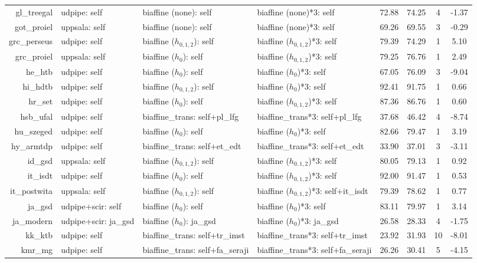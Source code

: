 \documentclass[11pt,a4paper]{article}
\begin{document}
\begin{table}[t]
\begin{tabular}{rlllcccc}
		gl\_treegal & udpipe: self & biaffine (none): self & biaffine (none)*3: self & 72.88 & 74.25 & 4 & -1.37 \\
		got\_proiel & uppsala: self & biaffine (none): self & biaffine (none)*3: self & 69.26 & 69.55 & 3 & -0.29 \\
		grc\_perseus & udpipe: self & biaffine ($h_{0,1,2}$): self & biaffine ($h_{0,1,2}$)*3: self & 79.39 & 74.29 & 1 & 5.10 \\
		grc\_proiel & uppsala: self & biaffine ($h_{0}$): self & biaffine ($h_{0,1,2}$)*3: self & 79.25 & 76.76 & 1 & 2.49 \\
		he\_htb & udpipe: self & biaffine ($h_{0}$): self & biaffine ($h_{0}$)*3: self & 67.05 & 76.09 & 3 & -9.04 \\
		hi\_hdtb & udpipe: self & biaffine ($h_{0,1,2}$): self & biaffine ($h_{0}$)*3: self & 92.41 & 91.75 & 1 & 0.66 \\
		hr\_set & udpipe: self & biaffine ($h_{0}$): self & biaffine ($h_{0,1,2}$)*3: self & 87.36 & 86.76 & 1 & 0.60 \\
		hsb\_ufal & udpipe: self & biaffine\_trans: self+pl\_lfg & biaffine\_trans*3: self+pl\_lfg & 37.68 & 46.42 & 4 & -8.74 \\
		hu\_szeged & udpipe: self & biaffine ($h_{0}$): self & biaffine ($h_{0}$)*3: self & 82.66 & 79.47 & 1 & 3.19 \\
		hy\_armtdp & udpipe: self & biaffine\_trans: self+et\_edt & biaffine\_trans*3: self+et\_edt & 33.90 & 37.01 & 3 & -3.11 \\
		id\_gsd & uppsala: self & biaffine ($h_{0,1,2}$): self & biaffine ($h_{0,1,2}$)*3: self & 80.05 & 79.13 & 1 & 0.92 \\
		it\_isdt & udpipe: self & biaffine ($h_{0}$): self & biaffine ($h_{0,1,2}$)*3: self & 92.00 & 91.47 & 1 & 0.53 \\
		it\_postwita & uppsala: self & biaffine ($h_{0,1,2}$): self & biaffine ($h_{0,1,2}$)*3: self+it\_isdt & 79.39 & 78.62 & 1 & 0.77 \\
		ja\_gsd & udpipe+scir: self & biaffine ($h_{0}$): self & biaffine ($h_{0}$)*3: self & 83.11 & 79.97 & 1 & 3.14 \\
		ja\_modern & udpipe+scir: ja\_gsd & biaffine ($h_{0}$): ja\_gsd & biaffine ($h_{0}$)*3: ja\_gsd & 26.58 & 28.33 & 4 & -1.75 \\
		kk\_ktb & udpipe: self & biaffine\_trans: self+tr\_imst & biaffine\_trans*3: self+tr\_imst & 23.92 & 31.93 & 10 & -8.01 \\
		kmr\_mg & udpipe: self & biaffine\_trans: self+fa\_seraji & biaffine\_trans*3: self+fa\_seraji & 26.26 & 30.41 & 5 & -4.15 \\

\end{tabular}
\end{table}
\end{document}
